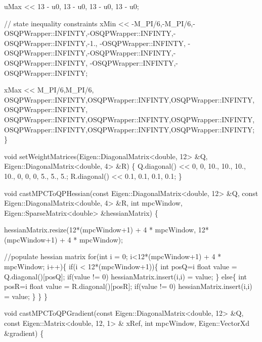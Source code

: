 \begin{DoxyCodeInclude}
    uMax << 13 - u0,
        13 - u0,
        13 - u0,
        13 - u0;

    \textcolor{comment}{// state inequality constraints}
    xMin << -M\_PI/6,-M\_PI/6,-OSQPWrapper::INFINTY,-OSQPWrapper::INFINTY,-OSQPWrapper::INFINTY,-1.,
        -OSQPWrapper::INFINTY, -OSQPWrapper::INFINTY,-OSQPWrapper::INFINTY,-OSQPWrapper::INFINTY,
        -OSQPWrapper::INFINTY,-OSQPWrapper::INFINTY;

    xMax << M\_PI/6,M\_PI/6, OSQPWrapper::INFINTY,OSQPWrapper::INFINTY,OSQPWrapper::INFINTY,
        OSQPWrapper::INFINTY, OSQPWrapper::INFINTY,OSQPWrapper::INFINTY,OSQPWrapper::INFINTY,
        OSQPWrapper::INFINTY,OSQPWrapper::INFINTY,OSQPWrapper::INFINTY;
\}

\textcolor{keywordtype}{void} setWeightMatrices(Eigen::DiagonalMatrix<double, 12> &Q, Eigen::DiagonalMatrix<double, 4> &R)
\{
    Q.diagonal() << 0, 0, 10., 10., 10., 10., 0, 0, 0, 5., 5., 5.;
    R.diagonal() << 0.1, 0.1, 0.1, 0.1;
\}

\textcolor{keywordtype}{void} castMPCToQPHessian(\textcolor{keyword}{const} Eigen::DiagonalMatrix<double, 12> &Q, \textcolor{keyword}{const} Eigen::DiagonalMatrix<double, 4> 
      &R, \textcolor{keywordtype}{int} mpcWindow,
                        Eigen::SparseMatrix<double> &hessianMatrix)
\{

    hessianMatrix.resize(12*(mpcWindow+1) + 4 * mpcWindow, 12*(mpcWindow+1) + 4 * mpcWindow);

    \textcolor{comment}{//populate hessian matrix}
    \textcolor{keywordflow}{for}(\textcolor{keywordtype}{int} i = 0; i<12*(mpcWindow+1) + 4 * mpcWindow; i++)\{
        \textcolor{keywordflow}{if}(i < 12*(mpcWindow+1))\{
            \textcolor{keywordtype}{int} posQ=i%
            \textcolor{keywordtype}{float} value = Q.diagonal()[posQ];
            \textcolor{keywordflow}{if}(value != 0)
                hessianMatrix.insert(i,i) = value;
        \}
        \textcolor{keywordflow}{else}\{
            \textcolor{keywordtype}{int} posR=i%
            \textcolor{keywordtype}{float} value = R.diagonal()[posR];
            \textcolor{keywordflow}{if}(value != 0)
                hessianMatrix.insert(i,i) = value;
        \}
    \}
\}

\textcolor{keywordtype}{void} castMPCToQPGradient(\textcolor{keyword}{const} Eigen::DiagonalMatrix<double, 12> &Q, \textcolor{keyword}{const} Eigen::Matrix<double, 12, 1> &
      xRef, \textcolor{keywordtype}{int} mpcWindow,
                         Eigen::VectorXd &gradient)
\{


\end{DoxyCodeInclude}
